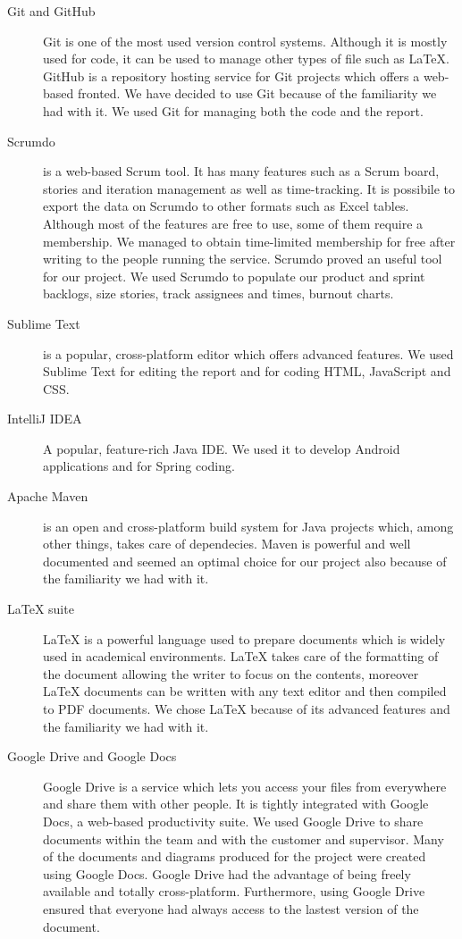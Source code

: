 \begin{description}

\item[Git and GitHub]
Git is one of the most used version control systems. Although it is mostly used for code, it can be used to manage other types of file such as LaTeX. GitHub is a repository hosting service for Git projects which offers a web-based fronted. We have decided to use Git because of the familiarity we had with it. We used Git for managing both the code and the report.

\item[Scrumdo]
is a web-based Scrum tool. It has many features such as a Scrum board, stories and iteration management
as well as time-tracking. It is possibile to export the data on Scrumdo to other formats such as Excel tables.
Although most of the features are free to use, some of them require a membership. We managed to obtain
time-limited membership for free after writing to the people running the service. Scrumdo proved an useful tool
for our project. We used Scrumdo to populate our product and sprint backlogs, size stories, track assignees
and times, burnout charts.

\item[Sublime Text]
is a popular, cross-platform editor which offers advanced features.
We used Sublime Text for editing the report and for coding HTML, JavaScript and CSS.

\item[IntelliJ IDEA]
A popular, feature-rich Java IDE. We used it to develop Android applications and for Spring coding.

\item[Apache Maven]
is an open and cross-platform build system for Java projects which, among other things, takes care of dependecies.
Maven is powerful and well documented and seemed an optimal choice for our project also because of the familiarity
we had with it.

\item[LaTeX suite]
LaTeX is a powerful language used to prepare documents which is widely used in academical environments.
LaTeX takes care of the formatting of the document allowing the writer to focus on the contents, moreover
LaTeX documents can be written with any text editor and then compiled to PDF documents. We chose LaTeX because
of its advanced features and the familiarity we had with it.

\item[Google Drive and Google Docs]
Google Drive is a service which lets you access your files from everywhere and share them with other people.
It is tightly integrated with Google Docs, a web-based productivity suite. We used Google Drive to share documents
within the team and with the customer and supervisor.
Many of the documents and diagrams produced for the project were created using Google Docs.
Google Drive had the advantage of being freely available and totally cross-platform. Furthermore,
using Google Drive ensured that everyone had always access to the lastest version of the document.


\end{description}
